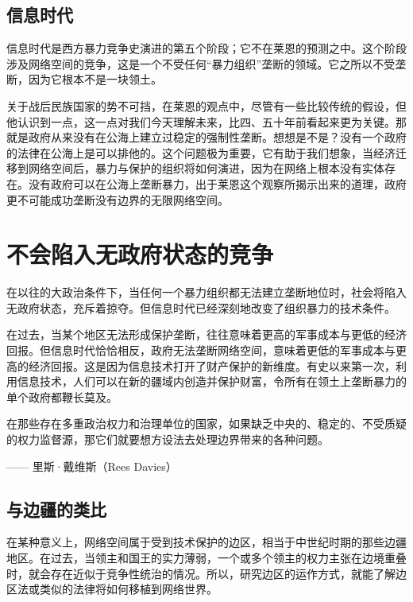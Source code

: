 \subsection{信息时代}
信息时代是西方暴力竞争史演进的第五个阶段；它不在莱恩的预测之中。这个阶段涉及网络空间的竞争，这是一个不受任何“暴力组织”垄断的领域。它之所以不受垄断，因为它根本不是一块领土。

关于战后民族国家的势不可挡，在莱恩的观点中，尽管有一些比较传统的假设，但他认识到一点，这一点对我们今天理解未来，比四、五十年前看起来更为关键。那就是政府从来没有在公海上建立过稳定的强制性垄断。想想是不是？没有一个政府的法律在公海上是可以排他的。这个问题极为重要，它有助于我们想象，当经济迁移到网络空间后，暴力与保护的组织将如何演进，因为在网络上根本没有实体存在。没有政府可以在公海上垄断暴力，出于莱恩这个观察所揭示出来的道理，政府更不可能成功垄断没有边界的无限网络空间。

\section{不会陷入无政府状态的竞争}
在以往的大政治条件下，当任何一个暴力组织都无法建立垄断地位时，社会将陷入无政府状态，充斥着掠夺。但信息时代已经深刻地改变了组织暴力的技术条件。

在过去，当某个地区无法形成保护垄断，往往意味着更高的军事成本与更低的经济回报。但信息时代恰恰相反，政府无法垄断网络空间，意味着更低的军事成本与更高的经济回报。这是因为信息技术打开了财产保护的新维度。有史以来第一次，利用信息技术，人们可以在新的疆域内创造并保护财富，令所有在领土上垄断暴力的单个政府都鞭长莫及。

\begin{tcolorbox}
\kaishu 在那些存在多重政治权力和治理单位的国家，如果缺乏中央的、稳定的、不受质疑的权力监督源，那它们就要想方设法去处理边界带来的各种问题。
\begin{flushright}
—— 里斯·戴维斯（Rees Davies）
\end{flushright}
\end{tcolorbox}

\subsection{与边疆的类比}

在某种意义上，网络空间属于受到技术保护的边区，相当于中世纪时期的那些边疆地区。在过去，当领主和国王的实力薄弱，一个或多个领主的权力主张在边境重叠时，就会存在近似于竞争性统治的情况。所以，研究边区的运作方式，就能了解边区法或类似的法律将如何移植到网络世界。


